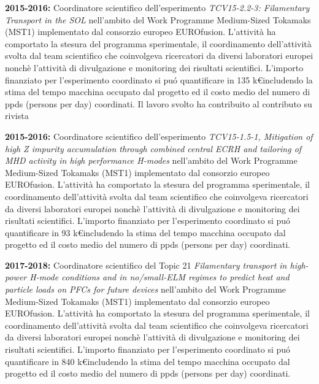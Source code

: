 \begin{enumerate}[label={[E\arabic*]}]
\item \textbf{2015-2016:} Coordinatore scientifico dell'esperimento
  \emph{TCV15-2.2-3: Filamentary Transport in the SOL} nell'ambito del
  Work Programme Medium-Sized Tokamaks (MST1) implementato dal
  consorzio europeo EUROfusion. L'attivit{\`a} ha comportato la
  stesura del programma sperimentale, il coordinamento
  dell'attivit{\`a} svolta dal team scientifico che coinvolgeva
  ricercatori da diversi laboratori europei nonch{\`e} l'attivit{\`a}
  di divulgazione e monitoring dei risultati scientifici.
  L'importo finanziato per l'esperimento
  coordinato si pu\'o quantificare in 135 k\euro includendo la stima
  del tempo macchina occupato dal progetto ed il costo
  medio del numero di ppds (persons per day) coordinati. Il lavoro
  svolto ha contribuito al contributo su rivista \cite{Vianello:2017ku}
%
\item \textbf{2015-2016:} Coordinatore scientifico dell'esperimento
  \emph{TCV15-1.5-1, Mitigation of high Z impurity accumulation
    through combined central ECRH and tailoring of MHD activity in
    high performance H-modes} nell'ambito del Work Programme
  Medium-Sized Tokamaks (MST1) implementato dal consorzio europeo
  EUROfusion. L'attivit{\`a} ha comportato la stesura del programma
  sperimentale, il coordinamento dell'attivit{\`a} svolta dal team
  scientifico che coinvolgeva ricercatori da diversi laboratori
  europei nonch{\`e} l'attivit{\`a} di divulgazione e monitoring dei
  risultati scientifici. L'importo finanziato per l'esperimento
  coordinato si pu\'o quantificare in 93 k\euro includendo la stima
  del tempo macchina occupato dal progetto ed il costo
  medio del numero di ppds (persons per day) coordinati. 
%
\item \textbf{2017-2018:} Coordinatore scientifico del Topic 21
  \emph{Filamentary transport in high-power H-mode conditions and in
    no/small-ELM regimes to predict heat and particle loads on PFCs
    for future devices } nell'ambito del Work Programme Medium-Sized
  Tokamaks (MST1) implementato dal consorzio europeo
  EUROfusion. L'attivit{\`a} ha comportato la stesura del programma
  sperimentale, il coordinamento dell'attivit{\`a} svolta dal team
  scientifico che coinvolgeva ricercatori da diversi laboratori
  europei nonch{\`e} l'attivit{\`a} di divulgazione e monitoring dei
  risultati scientifici. L'importo finanziato per l'esperimento
  coordinato si pu\'o quantificare in 840 k\euro includendo la stima
  del tempo macchina occupato dal progetto ed il costo
  medio del numero di ppds (persons per day) coordinati. 

\end{enumerate}
